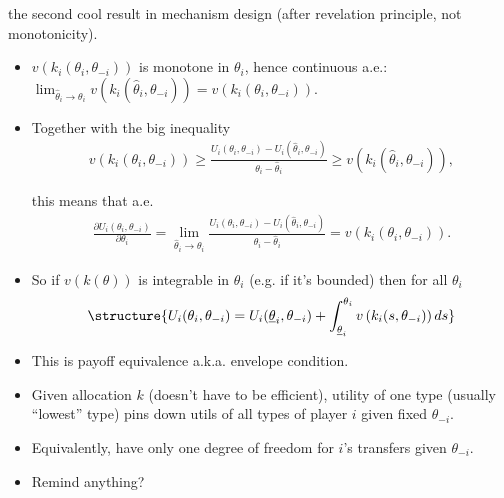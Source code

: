 \documentclass[english]{beamer}		%
\def\lyxframeend{} %
\begin{document}
the second cool result in mechanism design (after revelation principle, not monotonicity).
\lyxframeend


\begin{itemize}
	\item $v(k_i(\theta_i,\theta_{-i}))$ is monotone in $\theta_i$, hence continuous a.e.: $\lim_{\hat{\theta}_i \to \theta_i} v(k_i(\hat{\theta}_i,\theta_{-i})) = v(k_i(\theta_i,\theta_{-i}))$.
	\pause
	\item Together with the big inequality 
	{\small \vspace{-0.5em}\begin{align*}
		v \left( k_i(\theta_i,\theta_{-i}) \right) 
		\geq 
		\frac{ U_i(\theta_i, \theta_{-i}) - U_i(\hat{\theta}_i, \theta_{-i}) }{ \theta_i - \hat{\theta}_i } 
		\geq 
		v \left( k_i(\hat{\theta}_i,\theta_{-i}) \right),
	\end{align*}\vspace{-1em}}
	
	this means that a.e.
	\pause
	\vspace{-0.5em}\begin{align*}
		\frac{\partial U_i(\theta_i,\theta_{-i})}{\partial \theta_i} = \lim_{\hat{\theta}_i \to \theta_i} \frac{ U_i(\theta_i, \theta_{-i}) - U_i(\hat{\theta}_i, \theta_{-i}) }{ \theta_i - \hat{\theta}_i }  = v \left( k_i(\theta_i,\theta_{-i}) \right).
	\end{align*}\vspace{-1em}
\end{itemize}
\lyxframeend


\begin{itemize}
	\item So if $v(k(\theta))$ is integrable in $\theta_i$ (e.g. if it's bounded) then for all $\theta_i$
	\vspace{-0.5em}\begin{align*}
		\structure{
		U_i(\theta_i, \theta_{-i}) = U_i (\underline{\theta}_i,\theta_{-i}) + \int_{\underline{\theta}_i}^{\theta_i} v \left( k_i(s,\theta_{-i}) \right) d s
		}
	\end{align*}\vspace{-1em}
	\item This is \alert{payoff equivalence} a.k.a. envelope condition.
	\pause
	\item Given allocation $k$ (doesn't have to be efficient), utility of one type (usually ``lowest'' type) pins down utils of all types of player $i$ given fixed $\theta_{-i}$.
	\pause
	\item Equivalently, have only one degree of freedom for $i$'s transfers given $\theta_{-i}$.
	\item Remind anything?
\end{itemize}
\lyxframeend
\end{document}
